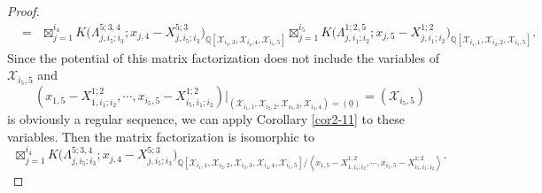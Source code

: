 \documentclass[10pt]{amsart}
\theoremstyle{break}
\begin{document}
\begin{proof}
\begin{eqnarray*}
&=& \mathop{\boxtimes}_{j=1}^{i_4} 
K\Big( \Lambda_{j,i_5;i_3}^{5;3,4} ;x_{j,4}-X^{5;3}_{j,i_5;i_3} \Big)_{{{\mathbb{Q}}} [\mathcal{X}_{i_{3},3},\mathcal{X}_{i_{4},4},\mathcal{X}_{i_{5},5}]} 
\mathop{\boxtimes}_{j=1}^{i_5}
K\Big( \Lambda_{j,i_1;i_2}^{1;2,5} ;x_{j,5}-X^{1;2}_{j,i_1;i_2} \Big)_{{{\mathbb{Q}}} [\mathcal{X}_{i_{1},1},\mathcal{X}_{i_{2},2},\mathcal{X}_{i_{5},5}]}.
\end{eqnarray*}
Since the potential of this matrix factorization does not include the variables of $\mathcal{X}_{i_5,5}$ and 
\begin{equation*}
(x_{1,5}-X^{1;2}_{1,i_1;i_2},\cdots ,x_{i_5,5}-X^{1;2}_{i_5,i_1;i_2})|_{(\mathcal{X}_{i_{1},1},\mathcal{X}_{i_{2},2},\mathcal{X}_{i_{3},3},\mathcal{X}_{i_{4},4})=(\underline{0})}=(\mathcal{X}_{i_{5},5})
\end{equation*}
is obviously a regular sequence, we can apply Corollary \ref{cor2-11} to these variables. Then the matrix factorization is isomorphic to
\begin{equation*}
\mathop{\boxtimes}_{j=1}^{i_4} K\Big( \Lambda_{j,i_5;i_3}^{5;3,4} ;x_{j,4}-X^{5;3}_{j,i_5;i_3} \Big)_{{{\mathbb{Q}}} [\mathcal{X}_{i_{1},1},\mathcal{X}_{i_{2},2},\mathcal{X}_{i_{3},3},\mathcal{X}_{i_{4},4},\mathcal{X}_{i_{5},5}]/
\left< x_{1,5}-X^{1;2}_{1,i_1;i_2},\cdots ,x_{i_5,5}-X^{1;2}_{i_5,i_1;i_2} \right> }. 
\end{equation*}


\end{proof}
\end{document}
